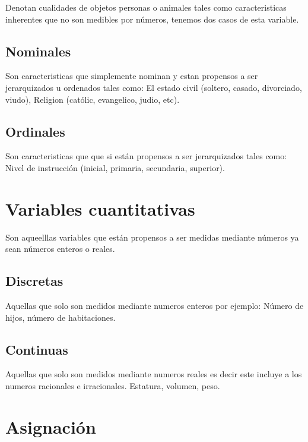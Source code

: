 \documentclass[
  10pt,
]{krantz}
\theoremstyle{definition}
\theoremstyle{definition}
\theoremstyle{definition}
\theoremstyle{definition}
\theoremstyle{remark}
\begin{document}
Denotan cualidades de objetos personas o animales tales como caracteristicas inherentes que no son medibles por números, tenemos dos casos de esta variable.

\hypertarget{nominales}{%
\subsection{Nominales}\label{nominales}}

Son caracteristicas que simplemente nominan y estan propensos a ser jerarquizados u ordenados tales como: El estado civil (soltero, casado, divorciado, viudo), Religion (católic, evangelico, judio, etc).

\hypertarget{ordinales}{%
\subsection{Ordinales}\label{ordinales}}

Son caracteristicas que que si están propensos a ser jerarquizados tales como: Nivel de instrucción (inicial, primaria, secundaria, superior).

\hypertarget{variables-cuantitativas}{%
\section{Variables cuantitativas}\label{variables-cuantitativas}}

Son aqueelllas variables que están propensos a ser medidas mediante números ya sean números enteros o reales.

\hypertarget{discretas}{%
\subsection{Discretas}\label{discretas}}

Aquellas que solo son medidos mediante numeros enteros por ejemplo: Número de hijos, número de habitaciones.

\hypertarget{continuas}{%
\subsection{Continuas}\label{continuas}}

Aquellas que solo son medidos mediante numeros reales es decir este incluye a los numeros racionales e irracionales. Estatura, volumen, peso.

\hypertarget{asignaciuxf3n}{%
\section{Asignación}\label{asignaciuxf3n}}
\end{document}

